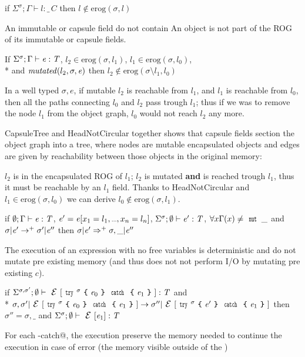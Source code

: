 \begin{Assumption}[HeadNotCircular]
if
$\Sigma^\sigma;\Gamma\vdash l:\_\,C$
then $l\notin\text{erog}(\sigma,l)$
\end{Assumption}
\noindent
\noindent An immutable or capsule field do not contain
An object is not part of the ROG of its immutable or capsule fields.


\begin{Assumption}[CapsuleTree]
If   $\Sigma^\sigma;\Gamma\vdash \e:\T$,
$l_2\in\text{erog}(\sigma,l_1)$,
$l_1\in\text{erog}(\sigma,l_0)$,\\*
and
$\mathit{mutated}(l_2,\sigma,\e)$
then 
$l_2\notin\text{erog}(\sigma\setminus l_1,l_0)$
\end{Assumption}
\noindent In a well typed $\sigma,e$, if mutable $l_2$ is reachable from
$l_1$, and $l_1$ is reachable from $l_0$,
then all the paths connecting $l_0$ and $l_2$ pass trough $l_1$; thus
if we was to remove the node $l_1$ from the object graph, $l_0$ would not reach $l_2$ any more.


CapsuleTree and HeadNotCircular together 
shows that capsule fields section the object graph into a tree,
where nodes are mutable encapsulated objects and
edges are given by reachability between those objects in the original memory:

$l_2$ is in the encapsulated ROG of $l_1$;
$l_2$ is mutated \textbf{and} is reached trough $l_1$, thus
it must be reachable by an $l_1$ \Q@capsule@ field.
Thanks to HeadNotCircular and $l_1\in\text{erog}(\sigma,l_0)$ we can derive 
$l_0\notin\text{erog}(\sigma,l_1)$.



\begin{Assumption}[Determinism]
if $\emptyset;\Gamma\vdash \e:\T$, $\e'=\e[x_1=l_1,\ldots,x_n=l_n]$,
$\Sigma^\sigma;\emptyset\vdash \e':\T$,
$\forall x \Gamma(x)\neq\Kw{mut}\,\_$ and
$\sigma | \e'\rightarrow^+ \sigma' | \e''$
then 
$\sigma | \e'\Rightarrow^+ \sigma,\_ | \e''$
\end{Assumption}
\noindent The execution of an expression
with no \Q@mut@ free variables is deterministic and do not
  mutate pre existing memory (and thus does not not perform I/O by mutating pre existing $c$).


\begin{Assumption}[StrongExceptionSafety]
if $\Sigma^{\sigma,\sigma'};\emptyset\vdash \ctx[\Kw{try}^\sigma\oC\e_0\cC\Kw{catch}\oC\e_1\cC]:\T$
and\\*
$
\sigma,\sigma'|\ctx[\Kw{try}^\sigma\oC\e_0\cC\Kw{catch}\oC\e_1\cC]\rightarrow 
\sigma''|\ctx[\Kw{try}^\sigma\oC\e'\cC\Kw{catch}\oC\e_1\cC]
$
then 
$\sigma''=\sigma,\_$
and
$\Sigma^\sigma;\emptyset\vdash \ctx[\e_1]:\T$
\end{Assumption}
\noindent
For each \Q@try-catch@, the execution preserve the memory needed to continue the execution in case of error
(the memory visible outside of the \Q@try@)%

